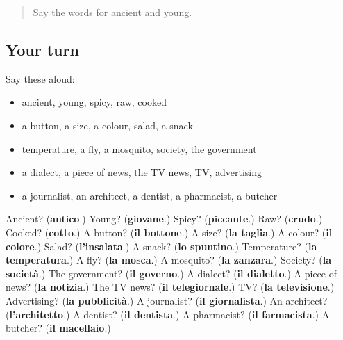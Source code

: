 \begin{quote}
Say the words for ancient and young.
\end{quote}

\subsection*{Your turn}
Say these aloud:

\begin{itemize}
\raggedright
  \item ancient, young, spicy, raw, cooked
  \item a button, a size, a colour, salad, a snack
  \item temperature, a fly, a mosquito, society, the government
  \item a dialect, a piece of news, the TV news, TV, advertising
  \item a journalist, an architect, a dentist, a pharmacist, a butcher
\end{itemize}

\begin{tcolorbox}[breakable,colback=teal!4,colframe=teal!35!black,title={Before you move on}]
Ancient? (\textbf{antico}.) Young? (\textbf{giovane}.) Spicy? (\textbf{piccante}.) Raw? (\textbf{crudo}.) Cooked? (\textbf{cotto}.) A button? (\textbf{il bottone}.) A size? (\textbf{la taglia}.) A colour? (\textbf{il colore}.) Salad? (\textbf{l'insalata}.) A snack? (\textbf{lo spuntino}.) Temperature? (\textbf{la temperatura}.) A fly? (\textbf{la mosca}.) A mosquito? (\textbf{la zanzara}.) Society? (\textbf{la società}.) The government? (\textbf{il governo}.) A dialect? (\textbf{il dialetto}.) A piece of news? (\textbf{la notizia}.) The TV news? (\textbf{il telegiornale}.) TV? (\textbf{la televisione}.) Advertising? (\textbf{la pubblicità}.) A journalist? (\textbf{il giornalista}.) An architect? (\textbf{l'architetto}.) A dentist? (\textbf{il dentista}.) A pharmacist? (\textbf{il farmacista}.) A butcher? (\textbf{il macellaio}.)
\end{tcolorbox}
